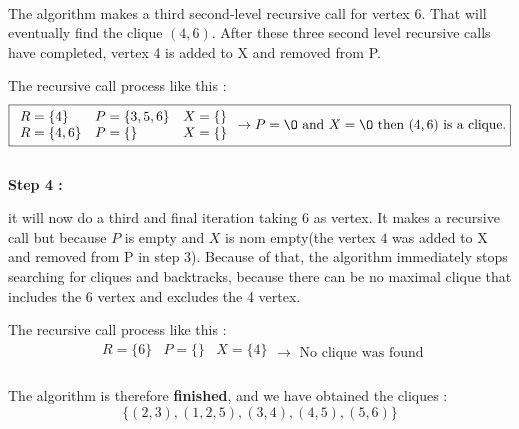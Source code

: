     \\
    \begin{minipage}{0.4\textwidth}
    \end{minipage}
    \begin{minipage}{0.6\textwidth}
        The algorithm makes a third second-level recursive call for vertex $6$. That will eventually find the clique $(4, 6)$. After these three second level recursive calls have completed, vertex 4 is added to X and removed from P.
    \end{minipage}
    The recursive call process like this  :
    $$ \boxed{
        \begin{array}{lll}
            R = \{4\} & P = \{3,5,6\} & X = \{\} \\
            R = \{4,6\} & P = \{\} & X = \{\} \\
        \end{array} 
        \rightarrow P = \O \text{ and } X = \O \text{ then } (4,6) \text{ is a clique.}
    }$$
    \\
    \hspace*{1cm}  \textbf{Step 4 :}
    \\
    \begin{minipage}{0.4\textwidth}
    \end{minipage}
    \begin{minipage}{0.6\textwidth}
        it will now do a third and final iteration taking 6 as vertex. It makes a recursive call but because $P$ is empty and $X$ is nom empty(the vertex $4$ was added to X and removed from P in step 3). Because of that, the algorithm immediately stops searching for cliques and backtracks, because there can be no maximal clique that includes the 6 vertex and excludes the 4 vertex.
    \end{minipage}
    The recursive call process like this  :
    $$ \boxed{
        \begin{array}{lll}
            R = \{6\} & P = \{\} & X = \{4\} \\
        \end{array} 
        \rightarrow \text{ No clique was found}
    }$$
    \\
    The algorithm is therefore \textbf{finished}, and we have obtained the cliques :
    $$\{(2,3),(1,2,5),(3,4),(4,5),(5,6)\}$$ 

